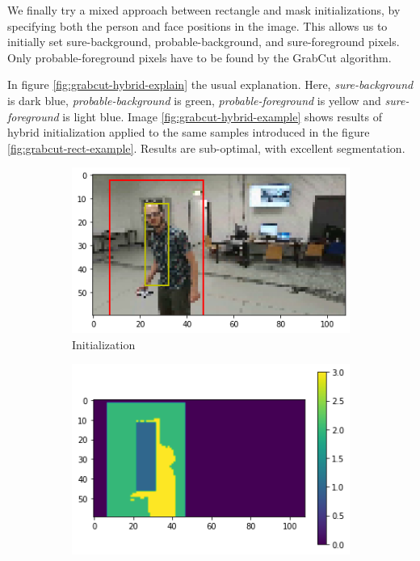We finally try a mixed approach between rectangle and mask initializations, by specifying both the person and face positions in the image. This allows us to initially set sure-background, probable-background, and sure-foreground pixels. Only probable-foreground pixels have to be found by the GrabCut algorithm. 

In figure \ref{fig:grabcut-hybrid-explain} the usual explanation. Here, \textit{sure-background} is dark blue, \textit{probable-background} is green, \textit{probable-foreground} is yellow and \textit{sure-foreground} is light blue. 
Image \ref{fig:grabcut-hybrid-example} shows results of hybrid initialization applied to the same samples introduced in the figure \ref{fig:grabcut-rect-example}. Results are sub-optimal, with excellent segmentation.

\begin{figure}[!h]
	\begin{center}
		\begin{subfigure}[h]{0.24\textwidth}
			\centering
			\includegraphics[width=1\textwidth]{"contents/images/04-2grabcut-3hybrid-steps-1"}
			\caption[]{Initialization}
			\label{fig:grabcut-hybrid-explain-1}
		\end{subfigure}
		\hfill
		\begin{subfigure}[h]{0.24\textwidth}
			\centering
			\includegraphics[width=1\textwidth]{"contents/images/04-2grabcut-3hybrid-steps-2"}

\end{subfigure}
\end{center}
\end{figure}
